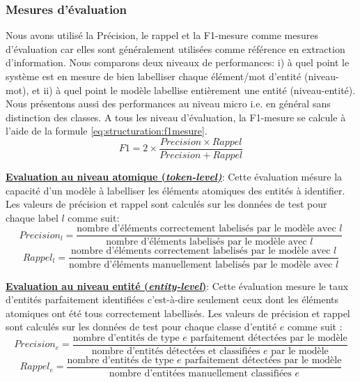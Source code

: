 \subsubsection{Mesures d'évaluation}
Nous avons utilisé la Précision, le rappel et la F1-mesure comme mesures d'évaluation car elles sont généralement utilisées comme référence en extraction d'information. Nous comparons deux niveaux de performances: i) à quel point le système est en mesure de bien labelliser chaque élément/mot d'entité (niveau-mot), et ii) à quel point le modèle labellise entièrement une entité (niveau-entité). Nous présentons aussi des performances au niveau micro i.e. en général sans distinction des classes. A tous les niveau d'évaluation, la F1-mesure se calcule à l'aide de la formule \ref{eq:structuration:f1mesure}.  
\begin{equation}\label{eq:structuration:f1mesure}
F1 = 2 \times \frac{Precision \times Rappel} {Precision + Rappel}
\end{equation}

\vspace{0.3cm}

\noindent \underline{\textbf{Evaluation au niveau atomique (\textit{token-level)}}}: Cette évaluation mésure la capacité d'un modèle à labelliser les éléments atomiques des entités à identifier. Les valeurs de précision et rappel sont calculés sur les données de test pour chaque label $l$ comme suit:
\[Precision_l = \frac{\text{nombre d'éléments correctement labelisés par le modèle avec } l} {\text{nombre d'éléments labelisés par le modèle avec } l}\]
\[Rappel_l = \frac{\text{nombre d'éléments correctement labelisés par le modèle avec } l} {\text{nombre d'éléments manuellement labelisés par le modèle avec } l}\]

\vspace{0.3cm}

\noindent \underline{\textbf{Evaluation au niveau entité (\textit{entity-level})}}: Cette évaluation mesure le taux d'entités parfaitement identifiées c'est-à-dire seulement ceux dont les éléments atomiques ont été tous correctement labellisés. Les valeurs de précision et rappel sont calculés sur les données de test pour chaque classe d'entité $e$ comme suit :
\[Precision_e = \frac{\text{nombre d'entités de type } e \text{ parfaitement détectées par le modèle}} {\text{nombre d'entités détectées et classifiées } e\text{ par le modèle}}\]
\[Rappel_e = \frac{\text{nombre d'entités de type } e \text{ parfaitement détectées par le modèle}} {\text{nombre d'entitées manuellement classifiées } e}\]

